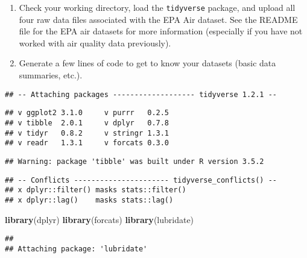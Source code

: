 \documentclass[]{article}
\newenvironment{Shaded}{\begin{snugshade}}{\end{snugshade}}
\newcommand{\KeywordTok}[1]{\textcolor[rgb]{0.13,0.29,0.53}{\textbf{#1}}}
\newcommand{\CommentTok}[1]{\textcolor[rgb]{0.56,0.35,0.01}{\textit{#1}}}
\newcommand{\NormalTok}[1]{#1}
\begin{document}
\begin{enumerate}
\def\labelenumi{\arabic{enumi}.}
\item
  Check your working directory, load the \texttt{tidyverse} package, and
  upload all four raw data files associated with the EPA Air dataset.
  See the README file for the EPA air datasets for more information
  (especially if you have not worked with air quality data previously).
\item
  Generate a few lines of code to get to know your datasets (basic data
  summaries, etc.).
\end{enumerate}

\begin{Shaded}
\end{Shaded}

\begin{verbatim}
## -- Attaching packages ------------------- tidyverse 1.2.1 --
\end{verbatim}

\begin{verbatim}
## v ggplot2 3.1.0     v purrr   0.2.5
## v tibble  2.0.1     v dplyr   0.7.8
## v tidyr   0.8.2     v stringr 1.3.1
## v readr   1.3.1     v forcats 0.3.0
\end{verbatim}

\begin{verbatim}
## Warning: package 'tibble' was built under R version 3.5.2
\end{verbatim}

\begin{verbatim}
## -- Conflicts ---------------------- tidyverse_conflicts() --
## x dplyr::filter() masks stats::filter()
## x dplyr::lag()    masks stats::lag()
\end{verbatim}

\begin{Shaded}
\begin{Highlighting}[]
\KeywordTok{library}\NormalTok{(dplyr)}
\KeywordTok{library}\NormalTok{(forcats)}
\KeywordTok{library}\NormalTok{(lubridate)}
\end{Highlighting}
\end{Shaded}

\begin{verbatim}
## 
## Attaching package: 'lubridate'
\end{verbatim}
\end{document}
